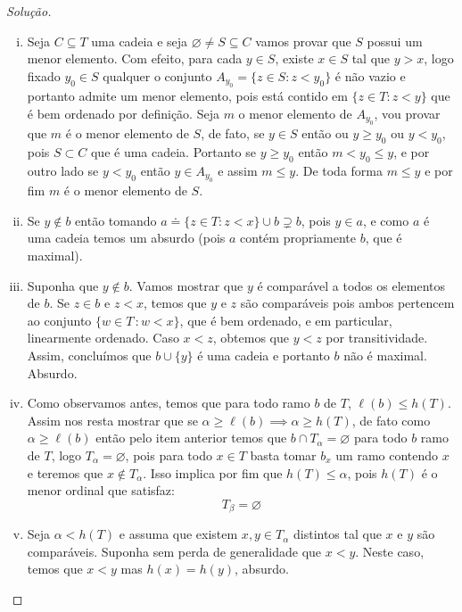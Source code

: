 \documentclass[a4paper]{article}
\theoremstyle{plain}\newtheorem{teo}{Teorema}[section]
\theoremstyle{plain}\newtheorem{prop}[teo]{Proposição}
\theoremstyle{plain}\newtheorem{lem}[teo]{Lema}
\theoremstyle{plain}\newtheorem{cor}[teo]{Corolário}
\theoremstyle{definition}\newtheorem{defi}[teo]{Definição}
\theoremstyle{remark}\newtheorem{rem}[teo]{Observação}
\theoremstyle{definition}\newtheorem{example}[teo]{Exemplo}
\theoremstyle{remark}\newtheorem{step}{\bf Step}
\begin{document}
  \begin{proof}[Solução]\hfill
    \begin{enumerate}[(i)]
      \item  Seja \(C\subseteq T\) uma cadeia e seja
        \(\varnothing\not = S\subseteq C\) vamos provar que \(S\) possui um menor
        elemento. Com efeito, para cada \(y\in S\), existe \(x\in S\) tal que \(y >x\), logo fixado $y_0\in S$ qualquer o conjunto $A_{y_0} =\{z\in S: z<y_{0}\}$ é não vazio e portanto admite um menor elemento, pois está contido em $\{z\in T: z<y\}$ que é bem ordenado por definição. Seja $m$ o menor elemento de $A_{y_0}$, vou provar que $m$ é o menor elemento de $S$, de fato, se $y\in S$ então ou $y\geq y_0$ ou $y<y_0$, pois $S\subset C$ que é uma cadeia.
        Portanto se $y\geq y_0$ então $m<y_0\leq y$, e por outro lado se $y<y_0$ então $y\in A_{y_0}$ e assim $m\leq y$. De toda forma $m\leq y$ e por fim $m$ é o menor elemento de $S$.
      \item Se $y\notin b$ então tomando $a\doteq\{z\in T: z<x\}\cup b\supsetneq b$, pois $y\in a$, e como $a$ é uma cadeia temos um absurdo (pois $a$ contém propriamente $b$, que é maximal).
      \item Suponha que \(y\not\in b\). Vamos mostrar que \(y\) é comparável
        a todos os elementos de \(b\). Se \(z\in b\) e \(z < x\), temos que
        \(y\) e \(z\) são comparáveis pois ambos pertencem ao conjunto \(\{w\in
        T\,\colon w< x \}\), que é bem ordenado, e em particular, linearmente
        ordenado. Caso \(x<z\), obtemos que \(y<z\) por transitividade. Assim,
        concluímos que \(b\cup\{y\}\) é uma cadeia e portanto \(b\) não é
        maximal. Absurdo.
      \item Como observamos antes, temos que para
todo ramo \(b\) de \(T\), \(\ell (b)\leq h(T)\). 
Assim nos resta mostrar que se $\alpha\geq \ell (b)\implies \alpha\geq h(T)$, de fato como $\alpha\geq \ell (b)$ então pelo item anterior temos que $b\cap T_\alpha=\varnothing$ para todo $b$ ramo de $T$, logo $T_\alpha=\varnothing$, pois para todo $x\in T$ basta tomar $b_x$ um ramo contendo $x$ e teremos que $x\notin T_\alpha$. Isso implica por fim que $h(T)\leq \alpha$, pois $h(T)$ é o menor ordinal que satisfaz: $$T_\beta =\varnothing$$  
        \item Seja \(\alpha < h(T)\) e assuma que existem \(x,y\in T_\alpha\)
          distintos tal que \(x\) e \(y\) são comparáveis.
          Suponha sem perda de generalidade que
      \(x<y\). Neste caso, temos que \(x<y\) mas \(h(x)=h(y)\), absurdo.\qedhere
  \end{enumerate}
  \end{proof}
\end{document}
